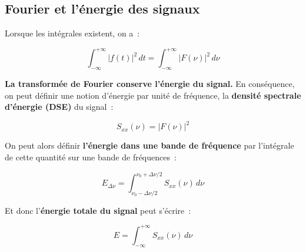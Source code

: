 \subsection*{Fourier et l'énergie des signaux}

Lorsque les intégrales existent, on a~:

\begin{equation}
	\int^{+\infty}_{-\infty}\left|f(t)\right|^2\,dt = \int^{+\infty}_{-\infty} \left| F(\nu) \right| ^2 \, d\nu
\end{equation} 

\textbf{La transformée de Fourier conserve l'énergie du signal.} En conséquence, on peut définir une notion d'énergie par unité de fréquence, la \textbf{densité spectrale d'énergie (DSE)} du signal~:

\begin{equation}
	S_{xx}(\nu) = \left| F(\nu) \right|^2
\end{equation}

On peut alors définir \textbf{l'énergie dans une bande de fréquence} par l'intégrale de cette quantité sur une bande de fréquences~: \\
\begin{center}
\begin{minipage}{0.4\textwidth}
\begin{center}

\end{center}
\end{minipage}
\begin{minipage}{0.5\textwidth}
\begin{equation}
E_{\Delta\nu} = \int^{\nu_0+\Delta\nu/2}_{\nu_0-\Delta\nu/2} S_{xx}(\nu)\,d\nu
\end{equation}
\end{minipage}
\end{center}

Et donc l'\textbf{énergie totale du signal} peut s'écrire~:

\begin{equation}
E = \int^{+\infty}_{-\infty} S_{xx}(\nu)\,d\nu
\end{equation}

\pagebreak

